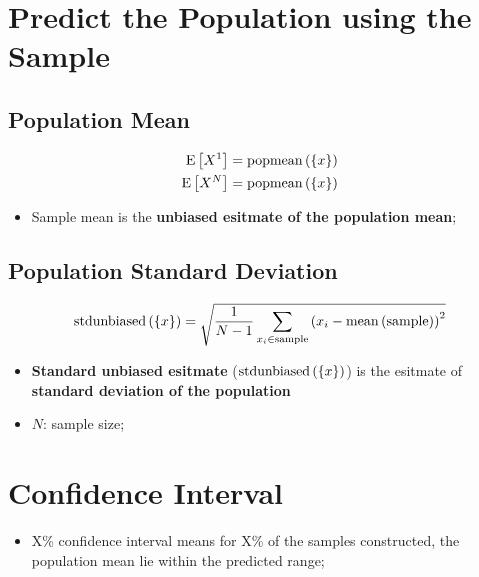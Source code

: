 \section{Predict the Population using the Sample}

  \subsection{Population Mean}
  
    \begin{align}
      \operatorname{E}\left[ X^{1} \right] &= \operatorname{popmean}\left( \{ x \} \right) \\
      \operatorname{E}\left[ X^{N} \right] &= \operatorname{popmean}\left( \{ x \} \right)
    \end{align}
    
    \begin{itemize}
      \item Sample mean is the \textbf{unbiased esitmate of the population mean};
    \end{itemize}

  \subsection{Population Standard Deviation}
  
    \begin{equation}
      \operatorname{stdunbiased}\left( \{ x \} \right) = \sqrt{ \frac{1}{N - 1} \sum_{x_{i} \in \text{sample}} \left( x_{i} - \operatorname{mean}\left( \text{sample} \right) \right)^{2} }
    \end{equation}
    
    \begin{itemize}
      \item \textbf{Standard unbiased esitmate} ($ \operatorname{stdunbiased}\left( \{ x \} \right) $) is the esitmate of \textbf{standard deviation of the population}
      \item $ N $: sample size;
    \end{itemize}

\section{Confidence Interval}

  \begin{itemize}
    \item X\% confidence interval means for X\% of the samples constructed, the population mean lie within the predicted range;
  \end{itemize}

